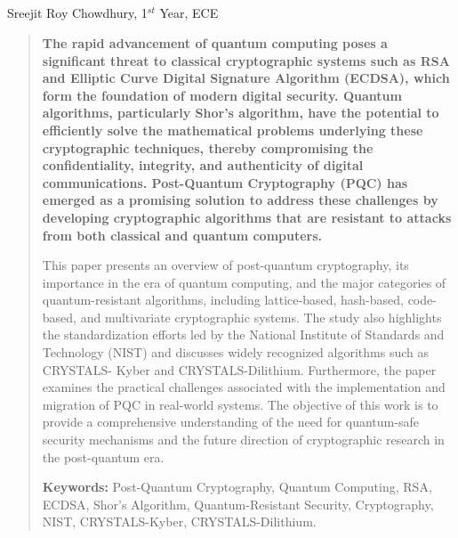 \begin{center}
  \section{}
  Sreejit Roy Chowdhury, 1$^{st}$ Year, ECE
\end{center}

\setcounter{figure}{0}

\begin{multicols}{2}
  \begin{abstract}
    \bfseries
    The rapid advancement of quantum computing poses a significant threat to classical cryptographic
    systems such as RSA and Elliptic Curve Digital Signature Algorithm (ECDSA), which form the foundation of
    modern digital security. Quantum algorithms, particularly Shor’s algorithm, have the potential to efficiently
    solve the mathematical problems underlying these cryptographic techniques, thereby compromising the
    confidentiality, integrity, and authenticity of digital communications. Post-Quantum Cryptography (PQC) has
    emerged as a promising solution to address these challenges by developing cryptographic algorithms that are
    resistant to attacks from both classical and quantum computers.

    \noindent
    This paper presents an overview of post-quantum cryptography, its importance in the era of quantum computing,
    and the major categories of quantum-resistant algorithms, including lattice-based, hash-based, code-based, and
    multivariate cryptographic systems. The study also highlights the standardization efforts led by the National
    Institute of Standards and Technology (NIST) and discusses widely recognized algorithms such as CRYSTALS-
    Kyber and CRYSTALS-Dilithium. Furthermore, the paper examines the practical challenges associated with the
    implementation and migration of PQC in real-world systems. The objective of this work is to provide a
    comprehensive understanding of the need for quantum-safe security mechanisms and the future direction of
    cryptographic research in the post-quantum era.

    \vspace{1em}
    {\justifying\noindent\textbf{Keywords:} Post-Quantum Cryptography, Quantum Computing, RSA, ECDSA, Shor’s Algorithm,
    Quantum-Resistant Security, Cryptography, NIST, CRYSTALS-Kyber, CRYSTALS-Dilithium.\par}
  \end{abstract}


\end{multicols}
